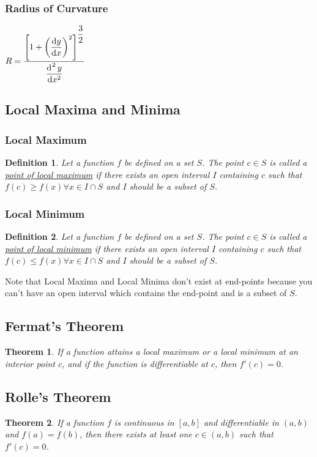 \documentclass[14]{article}
\newtheorem{theorem}{Theorem}
\newtheorem{define}{Definition}
\theoremstyle{definition}
\begin{document}
\subsubsection{Radius of Curvature}
$R = \dfrac{\left[ 1 + \left(\dfrac{\dif y}{\dif x}\right)^2\right]^{\dfrac32}}{\dfrac{\dif^{\;2}y}{\dif x ^2}}$
\pagebreak
\subsection{Local Maxima and Minima}
\subsubsection{Local Maximum}
\begin{define}
Let a function $f$ be defined on a set $S$. The point $c \in S$ is called a \underline{point of local maximum} if there exists an open interval $I$ containing $c$ such that $f(c) \geq f(x) \forall x \in I \cap S$ and $I$ should be a subset of $S$.
\end{define}
\subsubsection{Local Minimum}
\begin{define}
Let a function $f$ be defined on a set $S$. The point $c \in S$ is called a \underline{point of local minimum} if there exists an open interval $I$ containing $c$ such that $f(c) \leq f(x) \forall x \in I \cap S$ and $I$ should be a subset of $S$.
\end{define}
Note that Local Maxima and Local Minima don't exist at end-points because you can't have an open interval which contains the end-point and is a subset of $S$.
\subsection{Fermat's Theorem}
\begin{theorem}
If a function attains a local maximum or a local minimum at an interior point $c$, and if the function is differentiable at $c$, then $f'(c) = 0$.
\end{theorem}
\subsection{Rolle's Theorem}
\begin{theorem}
If a function $f$ is continuous in $[a, b]$ and differentiable in $(a, b)$ and $f(a) = f(b)$, then there exists at least one $c \in (a, b)$ such that $f'(c) = 0$.
\end{theorem}
\end{document}
